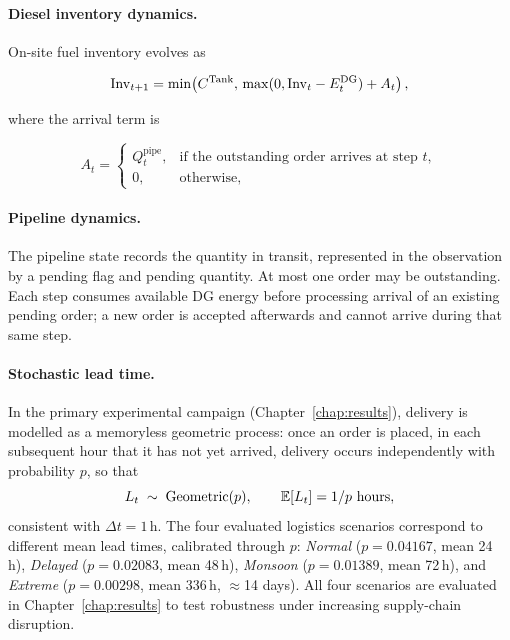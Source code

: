 \paragraph{Diesel inventory dynamics.}
On-site fuel inventory evolves as
\begin{revisedblock}
\begin{equation}
\mathrm{Inv}_{t+1}
=\min\!\left(C^{\mathrm{Tank}},\,
\max(0,\mathrm{Inv}_t-E_t^{\mathrm{DG}})+A_t\right),
\label{eq:inv}
\end{equation}
\end{revisedblock}
where the arrival term is
\begin{revisedblock}
\begin{equation}
A_t=\begin{cases}
Q_t^{\mathrm{pipe}}, & \text{if the outstanding order arrives at step }t,\\
0, & \text{otherwise,}
\end{cases}
\label{eq:arrival}
\end{equation}
\end{revisedblock}

\paragraph{Pipeline dynamics.}
\begin{revisedblock}
The pipeline state records the quantity in transit, represented in
the observation by a pending flag and pending quantity. At most one
order may be outstanding. Each step consumes available DG energy
before processing arrival of an existing pending order; a new order
is accepted afterwards and cannot arrive during that same step.
\end{revisedblock}

\paragraph{Stochastic lead time.}
In the primary experimental campaign (Chapter~\ref{chap:results}), delivery
is modelled as a memoryless geometric process: once an order is placed,
in each subsequent hour that it has not yet arrived, delivery occurs
independently with probability $p$, so that
\begin{equation}
L_t \;\sim\; \mathrm{Geometric}(p), \qquad \mathbb{E}[L_t] = 1/p \text{ hours},
\label{eq:leadtime}
\end{equation}
consistent with $\Delta t = 1$\,h. The four evaluated logistics scenarios
correspond to different mean lead times, calibrated through $p$: \emph{Normal}
($p=0.04167$, mean 24\,h), \emph{Delayed} ($p=0.02083$, mean 48\,h),
\emph{Monsoon} ($p=0.01389$, mean 72\,h), and \emph{Extreme} ($p=0.00298$,
mean 336\,h, $\approx$14 days). All four scenarios are evaluated in
Chapter~\ref{chap:results} to test robustness under increasing
supply-chain disruption.

